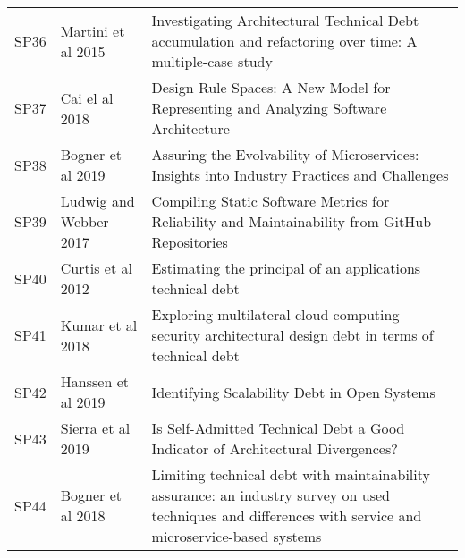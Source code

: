 \begin{tabular}{lll}
 SP36 &                                                       Martini et al 2015 &                                                                  Investigating Architectural Technical Debt accumulation and refactoring over time: A multiple-case study \\
 SP37 &                                                           Cai el al 2018 &                                                                                      Design Rule Spaces: A New Model for Representing and Analyzing Software Architecture \\
 SP38 &                                                        Bogner et al 2019 &                                                                               Assuring the Evolvability of Microservices: Insights into Industry Practices and Challenges \\
 SP39 &                                                   Ludwig and Webber 2017 &                                                                            Compiling Static Software Metrics for Reliability and Maintainability from GitHub Repositories \\
 SP40 &                                                        Curtis et al 2012 &                                                                                                                Estimating the principal of an applications technical debt \\
 SP41 &                                                         Kumar et al 2018 &                                                                      Exploring multilateral cloud computing security architectural design debt in terms of technical debt \\
 SP42 &                                                       Hanssen et al 2019 &                                                                                                                              Identifying Scalability Debt in Open Systems \\
 SP43 &                                                        Sierra et al 2019 &                                                                                            Is Self-Admitted Technical Debt a Good Indicator of Architectural Divergences? \\
 SP44 &                                                        Bogner et al 2018 &                 Limiting technical debt with maintainability assurance: an industry survey on used techniques and differences with service and microservice-based systems \\

\end{tabular}
